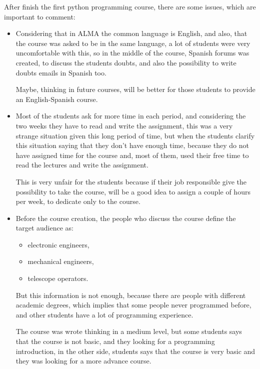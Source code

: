 \documentclass[letter, 10pt]{article}
\begin{document}
After finish the first python programming course,
there are some issues, which are important to comment:

\begin{itemize}
    \item Considering that in ALMA the common language is English,
          and also, that the course was asked to be in the same language,
          a lot of students were very uncomfortable with this,
          so in the middle of the course, Spanish forums was created,
          to discuss the students doubts, and also the possibility to
          write doubts emails in Spanish too.

          Maybe, thinking in future courses, will be better for those
          students to provide an English-Spanish course.

    \item Most of the students ask for more time in each period,
          and considering the two weeks they have to read and write the assignment,
          this was a very strange situation given this long period of time,
          but when the students clarify this situation saying
	  that they don't have enough time, because they do not
          have assigned time for the course and, most of them, used their
          free time to read the lectures and write the assignment.

          This is very unfair for the students because if their
          job responsible give the possibility to take the course,
          will be a good idea to assign a couple of hours per week,
          to dedicate only to the course.

    \item Before the course creation, the people who discuss the course
          define the target audience as:
          \begin{itemize}
              \item electronic engineers,
              \item mechanical engineers,
              \item telescope operators.
          \end{itemize}

          But this information is not enough,
          because there are people with different academic degrees,
          which implies that some people never programmed before,
          and other students have a lot of programming experience.

          The course was wrote thinking in a medium level,
          but some students says that the course is not basic,
          and they looking for a programming introduction,
          in the other side, students says that the course is
          very basic and they was looking for a more advance course.


\end{itemize}
\end{document}
